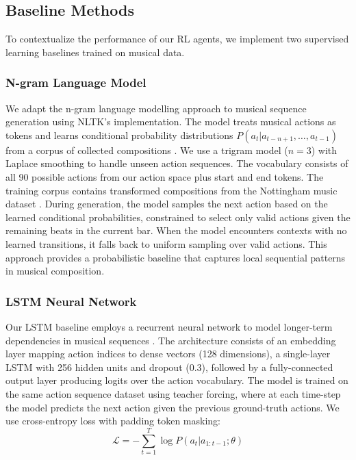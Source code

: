 \documentclass{article}
\begin{document}
\subsection{Baseline Methods}

To contextualize the performance of our RL agents, we implement two supervised learning baselines trained on musical data.

\subsubsection{N-gram Language Model}

We adapt the n-gram language modelling approach to musical sequence generation using NLTK's implementation. The model treats musical actions as tokens and learns conditional probability distributions $P(a_t | a_{t-n+1}, \ldots, a_{t-1})$ from a corpus of collected compositions \citep{ngram-site}.
We use a trigram model ($n=3$) with Laplace smoothing to handle unseen action sequences. The vocabulary consists of all 90 possible actions from our action space plus start and end tokens. The training corpus contains transformed compositions from the Nottingham music dataset \citep{nottingham-dataset}.
During generation, the model samples the next action based on the learned conditional probabilities, constrained to select only valid actions given the remaining beats in the current bar. When the model encounters contexts with no learned transitions, it falls back to uniform sampling over valid actions. This approach provides a probabilistic baseline that captures local sequential patterns in musical composition.

\subsubsection{LSTM Neural Network}

Our LSTM baseline employs a recurrent neural network to model longer-term dependencies in musical sequences \citep{lstm-paper}. The architecture consists of an embedding layer mapping action indices to dense vectors (128 dimensions), a single-layer LSTM with 256 hidden units and dropout (0.3), followed by a fully-connected output layer producing logits over the action vocabulary.
The model is trained on the same action sequence dataset using teacher forcing, where at each time-step the model predicts the next action given the previous ground-truth actions. We use cross-entropy loss with padding token masking:
\[
\mathcal{L} = -\sum_{t=1}^{T} \log P(a_t | a_{1:t-1}; \theta)
\]
\end{document}
